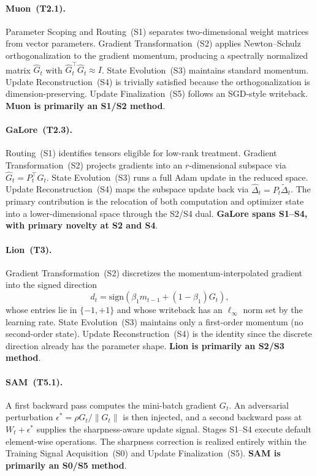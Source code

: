 \paragraph{Muon~\textup{(T2.1).}}
Parameter Scoping and Routing~(S1) separates two-dimensional weight matrices
from vector parameters.  Gradient Transformation~(S2) applies Newton--Schulz
orthogonalization to the gradient momentum, producing a spectrally normalized
matrix $\hat{G}_t$ with $\hat{G}_t^\top\hat{G}_t\approx I$.  State
Evolution~(S3) maintains standard momentum.  Update Reconstruction~(S4) is
trivially satisfied because the orthogonalization is dimension-preserving.
Update Finalization~(S5) follows an SGD-style writeback.
\textbf{Muon is primarily an S1/S2 method}.

\paragraph{GaLore~\textup{(T2.3).}}
Routing~(S1) identifies tensors eligible for low-rank treatment.  Gradient
Transformation~(S2) projects gradients into an $r$-dimensional subspace via
$\hat{G}_t = P_t^\top G_t$.  State Evolution~(S3) runs a full Adam update in
the reduced space.  Update Reconstruction~(S4) maps the subspace update back
via $\hat{\Delta}_t = P_t\tilde{\Delta}_t$.  The primary contribution is the
relocation of both computation and optimizer state into a
lower-dimensional space through the S2/S4 dual.
\textbf{GaLore spans S1--S4, with primary novelty at S2 and S4}.

\paragraph{Lion~\textup{(T3).}}
Gradient Transformation~(S2) discretizes the momentum-interpolated gradient
into the signed direction
\begin{equation}
  d_t = \mathrm{sign}\!\left(\beta_1 m_{t-1}+(1-\beta_1)G_t\right),
\end{equation}
whose entries lie in $\{-1,+1\}$ and whose writeback has an $\ell_\infty$
norm set by the learning rate.  State Evolution~(S3) maintains only a
first-order momentum (no second-order state).  Update Reconstruction~(S4) is
the identity since the discrete direction already has the parameter shape.
\textbf{Lion is primarily an S2/S3 method}.

\paragraph{SAM~\textup{(T5.1).}}
A first backward pass computes the mini-batch gradient $G_t$.  An adversarial
perturbation $\epsilon^* = \rho G_t/\|G_t\|$ is then injected, and a second
backward pass at $W_t+\epsilon^*$ supplies the sharpness-aware update signal.
Stages S1--S4 execute default element-wise operations.  The sharpness
correction is realized entirely within the Training Signal Acquisition~(S0)
and Update Finalization~(S5).
\textbf{SAM is primarily an S0/S5 method}.

